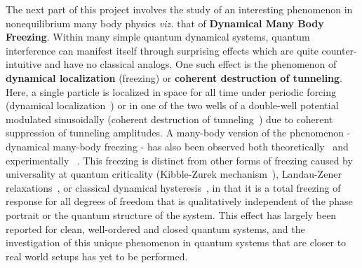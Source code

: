 \documentclass[a4paper,9pt]{article}
\begin{document}
The next part of this project involves the study of an interesting phenomenon in nonequilibrium many body physics \textit{viz.} that of \textbf{Dynamical Many Body Freezing}. Within many simple quantum dynamical systems, quantum interference can manifest itself through surprising effects which are quite counter-intuitive and have no classical analogs.
One such effect is the phenomenon of \textbf{dynamical localization} (freezing) or \textbf{coherent destruction of tunneling}. Here, a single particle is localized in space for all time under periodic forcing (dynamical localization~\cite{Dunlap}) or in one of the two wells of a double-well potential modulated sinusoidally (coherent destruction of tunneling~\cite{Hanggi}) due to
coherent suppression of tunneling amplitudes. A many-body version of the phenomenon - dynamical many-body freezing - has also been observed both theoretically~\cite{dmfth} and experimentally ~\cite{Mahesh}. This freezing is distinct from other forms of freezing caused by universality at quantum criticality (Kibble-Zurek mechanism~\cite{bikashbabu}), Landau-Zener relaxations~\cite{bikashbabu,Shevchenko-Ashhab-Nori-Rev}, or classical dynamical hysteresis~\cite{class:hyst}, in that it is a total freezing of response for all degrees of freedom  that is qualitatively independent of the phase portrait or the quantum structure of the system. This effect has largely been reported for clean, well-ordered and closed quantum systems, and the investigation of this unique phenomenon in quantum systems that are closer to real world setups has yet to be performed.
\end{document}
